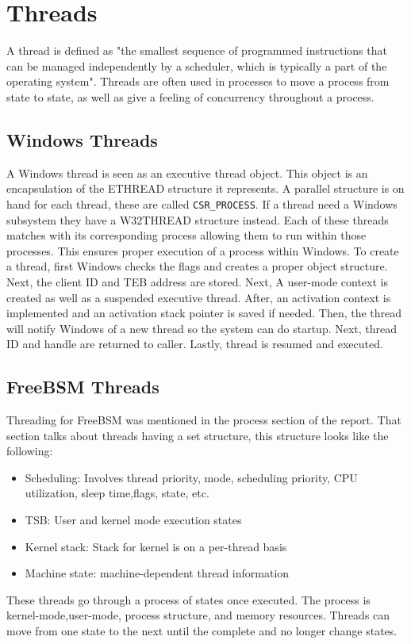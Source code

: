 \documentclass[onecolumn, draftclsnofoot,10pt, compsoc]{IEEEtran}
\begin{document}
\section{Threads}
A thread is defined as "the smallest sequence of programmed instructions that can be managed independently by a scheduler, which is typically a part of the operating system"\cite{6}. Threads are often used in processes to move a process from state to state, as well as give a feeling of concurrency throughout a process.
\subsection{Windows Threads}
A Windows thread is seen as an executive thread object. This object is an encapsulation of the ETHREAD structure it represents. A parallel structure is on hand for each thread, these are called \texttt{CSR\_PROCESS}. If a thread need a Windows subsystem they have a W32THREAD structure instead. Each of these threads matches with its corresponding process allowing them to run within those processes. This ensures proper execution of a process within Windows. To create a thread, first Windows checks the flags and creates a proper object structure. Next, the client ID and TEB address are stored. Next, A user-mode context is created as well as a suspended executive thread. After, an activation context is implemented and an activation stack pointer is saved if needed. Then, the thread will notify Windows of a new thread so the system can do startup. Next, thread ID and handle are returned to caller. Lastly, thread is resumed and executed\cite{2}.
\subsection{FreeBSM Threads}

Threading for FreeBSM was mentioned in the process section of the report. That section talks about threads having a set structure, this structure looks like the following\cite{1}:
\begin{itemize}
	\item Scheduling: Involves thread priority, mode, scheduling priority, CPU utilization, sleep time,flags, state, etc.
	\item TSB: User and kernel mode execution states
	\item Kernel stack: Stack for kernel is on a per-thread basis
	\item Machine state: machine-dependent thread information
\end{itemize}
These threads go through a process of states once executed. The process is kernel-mode,user-mode, process structure, and memory resources. Threads can move from one state to the next until the complete and no longer change states.
\end{document}
